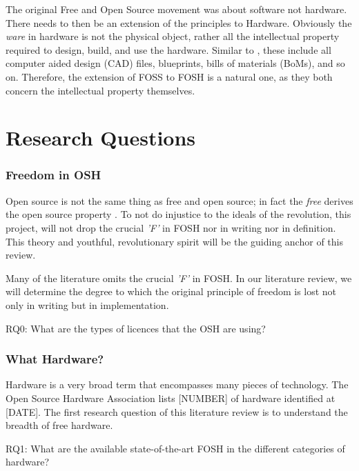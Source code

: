 \documentclass{article}
\begin{document}
The original Free and Open Source movement was about software not hardware.
There needs to then be an extension of the principles to Hardware.
Obviously the \textit{ware} in hardware is not the physical object, rather all the intellectual property required to design, build, and use the hardware. 
Similar to \cite{p1_def_succ}, these include all computer aided design (CAD) files, blueprints, bills of materials (BoMs), and so on. 
Therefore, the extension of FOSS to FOSH is a natural one, as they both concern the intellectual property themselves. 

\section{Research Questions}

\subsubsection{Freedom in OSH}
Open source is not the same thing as free and open source; in fact the \textit{free} derives the open source property \cite{b0_stallman}. 
To not do injustice to the ideals of the revolution, this project, will not drop the crucial \textit{'F'} in FOSH nor in writing nor in definition.
This theory and youthful, revolutionary spirit will be the guiding anchor of this review.

Many of the literature omits the crucial \textit{'F'} in FOSH.
In our literature review, we will determine the degree to which the original principle of freedom is lost not only in writing but in implementation.

RQ0: What are the types of licences that the OSH are using?

\subsubsection{What Hardware?}
\label{RQ1}
Hardware is a very broad term that encompasses many pieces of technology.
The Open Source Hardware Association lists [NUMBER] of hardware identified at [DATE].
The first research question of this literature review is to understand the breadth of free hardware.

RQ1: What are the available state-of-the-art FOSH in the different categories of hardware?
\end{document}
